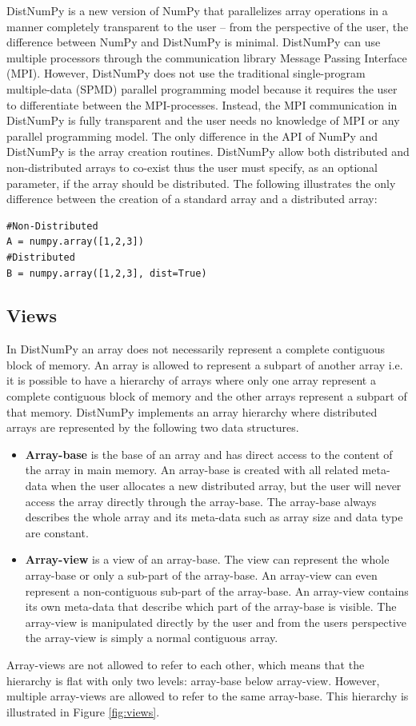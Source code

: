 \documentclass[preprint]{../PGAS10/sigplanconf}
\begin{document}
DistNumPy is a new version of NumPy that parallelizes array operations in a manner completely transparent to the user -- from the perspective of the user, the difference between NumPy and DistNumPy is minimal. DistNumPy can use multiple processors through the communication library Message Passing Interface (MPI)\cite{mpi}. However, DistNumPy does not use the traditional single-program multiple-data (SPMD) parallel programming model because it requires the user to differentiate between the MPI-processes. Instead, the MPI communication in DistNumPy is fully transparent and the user needs no knowledge of MPI or any parallel programming model. 
The only difference in the API of NumPy and DistNumPy is the array creation routines. DistNumPy allow both distributed and non-distributed arrays to co-exist thus the user must specify, as an optional parameter, if the array should be distributed. The following illustrates the only difference between the creation of a standard array and a distributed array:
\lstset{frame=none, xleftmargin=0mm, numbers=none}
\begin{lstlisting}
#Non-Distributed
A = numpy.array([1,2,3])
#Distributed
B = numpy.array([1,2,3], dist=True)
\end{lstlisting}
\lstset{frame=single, xleftmargin=5mm, numbers=left}

\subsection{Views}
In DistNumPy an array does not necessarily represent a complete contiguous block of memory. An array is allowed to represent a subpart of another array i.e. it is possible to have a hierarchy of arrays where only one array represent a complete contiguous block of memory and the other arrays represent a subpart of that memory. DistNumPy implements an array hierarchy where distributed arrays are represented by the following two data structures.
\begin{itemize}
\item \textbf{Array-base} is the base of an array and has direct access to the content of the array in main memory. An array-base is created with all related meta-data when the user allocates a new distributed array, but the user will never access the array directly through the array-base. The array-base always describes the whole array and its meta-data such as array size and data type are constant.
\item \textbf{Array-view} is a view of an array-base. The view can represent the whole array-base or only a sub-part of the array-base. An array-view can even represent a non-contiguous sub-part of the array-base. An array-view contains its own meta-data that describe which part of the array-base is visible. The array-view is manipulated directly by the user and from the users perspective the array-view is simply a normal contiguous array.
\end{itemize}
Array-views are not allowed to refer to each other, which means that the hierarchy is flat with only two levels: array-base below array-view. However, multiple array-views are allowed to refer to the same array-base. This hierarchy is illustrated in Figure \ref{fig:views}. 
\end{document}
